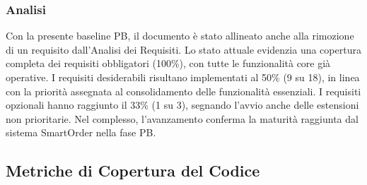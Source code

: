 \documentclass[a4paper,11pt,oneside]{scrartcl}
\begin{document}
\subsubsection*{Analisi}

Con la presente baseline PB, il documento è stato allineato anche alla rimozione di un requisito dall'Analisi dei Requisiti. Lo stato attuale evidenzia una copertura completa dei requisiti obbligatori (100\%), con tutte le funzionalità core già operative. I requisiti desiderabili risultano implementati al 50\% (9 su 18), in linea con la priorità assegnata al consolidamento delle funzionalità essenziali. I requisiti opzionali hanno raggiunto il 33\% (1 su 3), segnando l'avvio anche delle estensioni non prioritarie. Nel complesso, l'avanzamento conferma la maturità raggiunta dal sistema SmartOrder nella fase PB.

\subsection{Metriche di Copertura del Codice}
\end{document}
